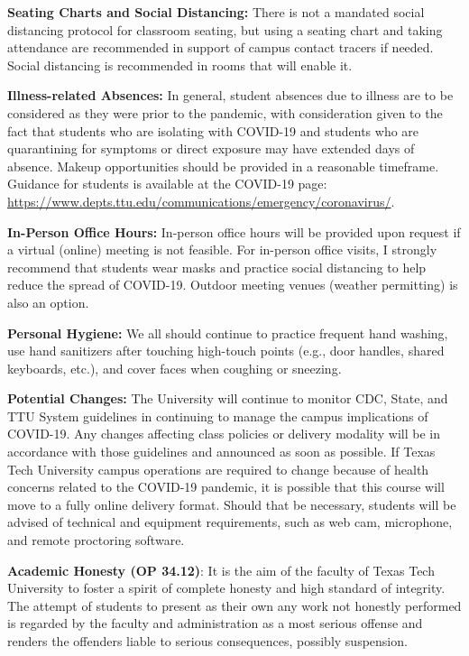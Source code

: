 \documentclass[11pt]{NSF}
\begin{document}
{\bf Seating Charts and Social Distancing:}
There is not a mandated social distancing protocol for classroom seating, but
using a seating chart and taking attendance are recommended in support of
campus contact tracers if needed. Social distancing is recommended in rooms
that will enable it.

{\bf Illness-related Absences:} 
In general, student absences due to illness are to be considered as they were
prior to the pandemic, with consideration given to the fact that students who
are isolating with COVID-19 and students who are quarantining for symptoms or
direct exposure may have extended days of absence. Makeup opportunities should
be provided in a reasonable timeframe. Guidance for students is available at 
the COVID-19 page:
\url{https://www.depts.ttu.edu/communications/emergency/coronavirus/}.

{\bf In-Person Office Hours:} In-person office hours will be provided upon
request if a virtual (online) meeting is not feasible. For in-person 
office visits, I strongly recommend that students wear masks and
practice social distancing to help reduce the spread of COVID-19.  Outdoor
meeting venues (weather permitting) is also an option.

{\bf Personal Hygiene:} 
We all should continue to practice frequent hand washing, use hand sanitizers
after touching high-touch points (e.g., door handles, shared keyboards, etc.),
and cover faces when coughing or sneezing.

{\bf Potential Changes:} 
The University will continue to monitor CDC, State, and TTU System guidelines
in continuing to manage the campus implications of COVID-19. Any changes
affecting class policies or delivery modality will be in accordance with those
guidelines and announced as soon as possible. If Texas Tech University campus
operations are required to change because of health concerns related to the
COVID-19 pandemic, it is possible that this course will move to a fully online
delivery format. Should that be necessary, students will be advised of
technical and equipment requirements, such as web cam, microphone, and remote
proctoring software.

{\bf Academic Honesty (OP 34.12)}:
It is the aim of the faculty of Texas Tech University to foster a
spirit of complete honesty and high standard of integrity. The attempt
of students to present as their own any work not honestly performed is
regarded by the faculty and administration as a most serious offense
and renders the offenders liable to serious consequences, possibly
suspension. 
\end{document}
